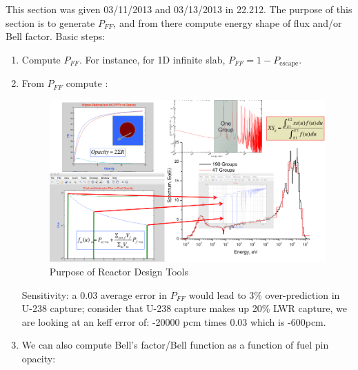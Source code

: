 \documentclass{school-22.211-notes}
\date{March  7, 2012}
\begin{document}
\maketitle

This section was given 03/11/2013 and 03/13/2013 in 22.212. The purpose of this section is to generate $P_{FF}$, and from there compute energy shape of flux and/or Bell factor. Basic steps: 
\begin{enumerate}
\item Compute $P_{FF}$. For instance, for 1D infinite slab, $P_{FF} = 1 - P_{\mathrm{escape}}$. 

\item From $P_{FF}$ compute : 
\begin{figure}[h]
  \centering
  \includegraphics[width=6in]{images/pin/design-tool.png}
  \caption{Purpose of Reactor Design Tools} \label{design-tool}
\end{figure}
Sensitivity: a 0.03 average error in $P_{FF}$ would lead to 3\% over-prediction in U-238 capture; consider that U-238 capture makes up 20\% LWR capture, we are looking at an keff error of: -20000 pcm times 0.03 which is -600pcm. 

\item We can also compute Bell's factor/Bell function as a function of fuel pin opacity: 
\end{enumerate}
\end{document}

